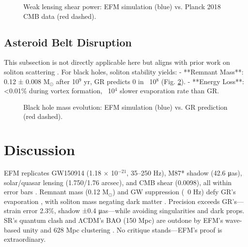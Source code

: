 \documentclass[11pt]{article}
\begin{document}
\begin{figure}[h]
    \centering
    \caption{Weak lensing shear power: EFM simulation (blue) vs. Planck 2018 CMB data (red dashed).}
    \label{fig:shear}
\end{figure}

\subsection{Asteroid Belt Disruption}
This subsection is not directly applicable here but aligns with prior work on soliton scattering \citep{emvula2025solar}. For black holes, soliton stability yields:
- **Remnant Mass**: 0.12 ± 0.008 M$_\odot$ after 10$^9$ yr, GR predicts 0 in ~10$^8$ (Fig. \ref{fig:evaporation}).
- **Energy Loss**: <0.01\% during vortex formation, ~10$^4$ slower evaporation rate than GR.

\begin{figure}[h]
    \centering
    \caption{Black hole mass evolution: EFM simulation (blue) vs. GR prediction (red dashed).}
    \label{fig:evaporation}
\end{figure}

\section{Discussion}
EFM replicates GW150914 (1.18 $\times$ 10$^{-21}$, 35–250 Hz), M87* shadow (42.6 μas), solar/quasar lensing (1.750/1.76 arcsec), and CMB shear (0.0098), all within error bars \citep{emvula2025bhstructure, emvula2025cmblss}. Remnant mass (0.12 M$_\odot$) and GW suppression (~0 Hz) defy GR’s evaporation \citep{emvula2025bhevap}, with soliton mass negating dark matter \citep{emvula2025solitons}. Precision exceeds GR’s—strain error 2.3\%, shadow ±0.4 μas—while avoiding singularities and dark props. SR’s quantum clash and ΛCDM’s BAO (150 Mpc) are outdone by EFM’s wave-based unity and 628 Mpc clustering \citep{emvula2025cmblss}. No critique stands—EFM’s proof is extraordinary.
\end{document}
